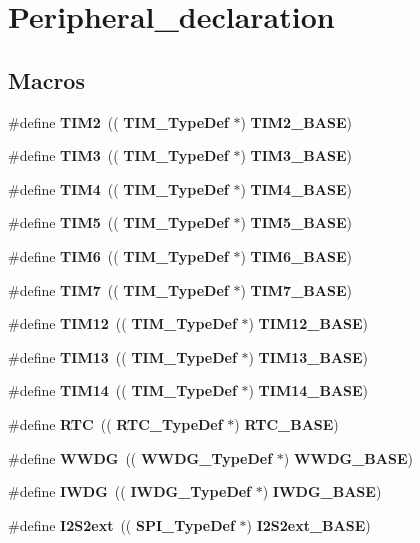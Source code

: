 \section{Peripheral\+\_\+declaration}
\label{group__Peripheral__declaration}
\subsection*{Macros}
\begin{DoxyCompactItemize}
\item 
\#define \textbf{ T\+I\+M2}~((\textbf{ T\+I\+M\+\_\+\+Type\+Def} $\ast$) \textbf{ T\+I\+M2\+\_\+\+B\+A\+SE})
\item 
\#define \textbf{ T\+I\+M3}~((\textbf{ T\+I\+M\+\_\+\+Type\+Def} $\ast$) \textbf{ T\+I\+M3\+\_\+\+B\+A\+SE})
\item 
\#define \textbf{ T\+I\+M4}~((\textbf{ T\+I\+M\+\_\+\+Type\+Def} $\ast$) \textbf{ T\+I\+M4\+\_\+\+B\+A\+SE})
\item 
\#define \textbf{ T\+I\+M5}~((\textbf{ T\+I\+M\+\_\+\+Type\+Def} $\ast$) \textbf{ T\+I\+M5\+\_\+\+B\+A\+SE})
\item 
\#define \textbf{ T\+I\+M6}~((\textbf{ T\+I\+M\+\_\+\+Type\+Def} $\ast$) \textbf{ T\+I\+M6\+\_\+\+B\+A\+SE})
\item 
\#define \textbf{ T\+I\+M7}~((\textbf{ T\+I\+M\+\_\+\+Type\+Def} $\ast$) \textbf{ T\+I\+M7\+\_\+\+B\+A\+SE})
\item 
\#define \textbf{ T\+I\+M12}~((\textbf{ T\+I\+M\+\_\+\+Type\+Def} $\ast$) \textbf{ T\+I\+M12\+\_\+\+B\+A\+SE})
\item 
\#define \textbf{ T\+I\+M13}~((\textbf{ T\+I\+M\+\_\+\+Type\+Def} $\ast$) \textbf{ T\+I\+M13\+\_\+\+B\+A\+SE})
\item 
\#define \textbf{ T\+I\+M14}~((\textbf{ T\+I\+M\+\_\+\+Type\+Def} $\ast$) \textbf{ T\+I\+M14\+\_\+\+B\+A\+SE})
\item 
\#define \textbf{ R\+TC}~((\textbf{ R\+T\+C\+\_\+\+Type\+Def} $\ast$) \textbf{ R\+T\+C\+\_\+\+B\+A\+SE})
\item 
\#define \textbf{ W\+W\+DG}~((\textbf{ W\+W\+D\+G\+\_\+\+Type\+Def} $\ast$) \textbf{ W\+W\+D\+G\+\_\+\+B\+A\+SE})
\item 
\#define \textbf{ I\+W\+DG}~((\textbf{ I\+W\+D\+G\+\_\+\+Type\+Def} $\ast$) \textbf{ I\+W\+D\+G\+\_\+\+B\+A\+SE})
\item 
\#define \textbf{ I2\+S2ext}~((\textbf{ S\+P\+I\+\_\+\+Type\+Def} $\ast$) \textbf{ I2\+S2ext\+\_\+\+B\+A\+SE})
\item 

\end{DoxyCompactItemize}
